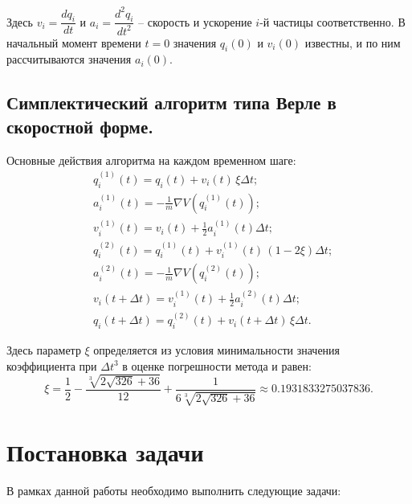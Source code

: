 \documentclass[14pt,a4paper]{extarticle}
\theoremstyle{plain}
\begin{document}
	Здесь $v_i = \dfrac{d q_i}{dt}$ и $a_i = \dfrac{d^2 q_i}{d t^2}$ -- скорость и ускорение $i$-й частицы соответственно. В начальный момент времени $t=0$ значения $q_i(0)$ и $v_i(0)$ известны, и по ним рассчитываются значения $a_i(0)$.
	
	\subsection{Симплектический алгоритм типа Верле в скоростной форме.} Основные действия алгоритма на каждом временном шаге:
	\begin{align*}
		&q_i^{(1)}(t) = q_i(t) + v_i(t)\,\xi\Delta t; \\
		&a_i^{(1)}(t) = -\frac{1}{m}\nabla V(q_i^{(1)}(t)); \\
		&v_i^{(1)}(t) = v_i(t) + \frac{1}{2}a_i^{(1)}(t)\Delta t; \\
		&q_i^{(2)}(t) = q_i^{(1)}(t) + v_i^{(1)}(t)\,(1-2\xi)\Delta t; \\
		&a_i^{(2)}(t) = -\frac{1}{m}\nabla V(q_i^{(2)}(t)); \\
		&v_i(t+\Delta t) = v_i^{(1)}(t) + \frac{1}{2}a_i^{(2)}(t)\Delta t; \\
		&q_i(t+\Delta t) = q_i^{(2)}(t) + v_i(t+\Delta t)\,\xi\Delta t.
	\end{align*}
	
	Здесь параметр $\xi$ определяется из условия минимальности значения коэффициента при $\Delta t^3$ в оценке погрешности метода и равен:
	\begin{equation}
		\xi = \frac{1}{2} - \frac{\sqrt[3]{2\sqrt{326}+36}}{12} + \frac{1}{6\sqrt[3]{2\sqrt{326}+36}} \approx 0.1931833275037836.
		\label{xi_parameter}
		\nonumber
	\end{equation}
	
	\newpage
	\section{Постановка задачи}
	
	В рамках данной работы необходимо выполнить следующие задачи:
	
\end{document}
